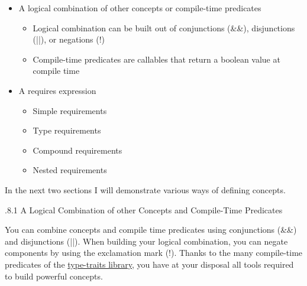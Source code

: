 \begin{itemize}
\item 
A logical combination of other concepts or compile-time predicates

\begin{itemize}
\item 
Logical combination can be built out of conjunctions (\&\&), disjunctions (||), or negations (!)

\item 
Compile-time predicates are callables that return a boolean value at compile time
\end{itemize}

\item 
A requires expression
\begin{itemize}
\item 
Simple requirements

\item 
Type requirements

\item 
Compound requirements

\item 
Nested requirements
\end{itemize}
\end{itemize}

In the next two sections I will demonstrate various ways of defining concepts.

.8.1\hspace{0.2cm} A Logical Combination of other Concepts and Compile-Time Predicates

You can combine concepts and compile time predicates using conjunctions (\&\&) and disjunctions (||). When building your logical combination, you can negate components by using the exclamation mark (!). Thanks to the many compile-time predicates of the \href{https://en.cppreference.com/w/cpp/header/type_traits}{type-traits library}, you have at your disposal all tools required to build powerful concepts.

